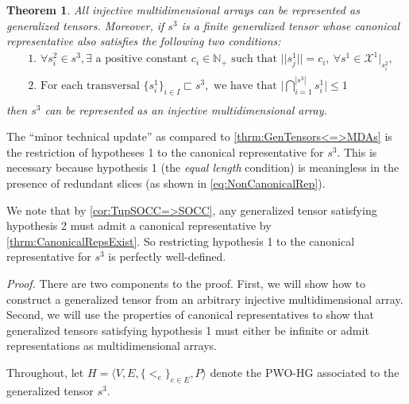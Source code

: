 \documentclass{article}
\theoremstyle{plain}
\newtheorem{theorem}{Theorem}[section]
\theoremstyle{definition}
\theoremstyle{remark}
\newcommand{\cX}{\mathcal{X}}
\begin{document}
\begin{theorem}
	All injective multidimensional arrays can be represented as generalized tensors. Moreover, if $s^3$ is a finite generalized tensor whose canonical representative also satisfies the following two conditions:
	\begin{equation*}
		\begin{aligned}
			&\textit{1. } \forall s^2_i \in s^3, \exists \text{ a positive constant } c_i \in \mathbb{N}_+ \text{ such that } ||s^1_j|| = c_i, \ \forall s^1 \in \cX^1|_{s^2_i},\\
			&\textit{2. } \text{For each transversal } \{s^1_i\}_{i\in I} \sqsubset s^3, \text{ we have that } \bigg| \bigcap_{i=1}^{|s^3|} s^1_i \bigg| \leq 1\\
		\end{aligned}
	\end{equation*}
	\vspace{-0.5em}
	then $s^3$ can be represented as an injective multidimensional array.
	\label{thrm:GenTensors<=>MDAs_Appendix}
\end{theorem}
The ``minor technical update'' as compared to \cref{thrm:GenTensors<=>MDAs} is the restriction of hypotheses 1 to the canonical representative for $s^3$. This is necessary because hypothesis 1 (the \textit{equal length} condition) is meaningless in the presence of redundant slices (as shown in \cref{eq:NonCanonicalRep}).

We note that by \cref{cor:TupSOCC=>SOCC}, any generalized tensor satisfying hypothesis 2 must admit a canonical representative by \cref{thrm:CanonicalRepsExist}. So restricting hypothesis 1 to the canonical representative for $s^3$ is perfectly well-defined.

\noindent\textit{Proof.}
	There are two components to the proof. First, we will show how to construct a generalized tensor from an arbitrary injective multidimensional array. Second, we will use the properties of canonical representatives to show that generalized tensors satisfying hypothesis 1 must either be infinite or admit representations as multidimensional arrays.
	
	Throughout, let $H = \big\langle V, E, \{<_e\}_{e \in E}, P \big\rangle$ denote the PWO-HG associated to the generalized tensor $s^3$. 
	
\end{document}
